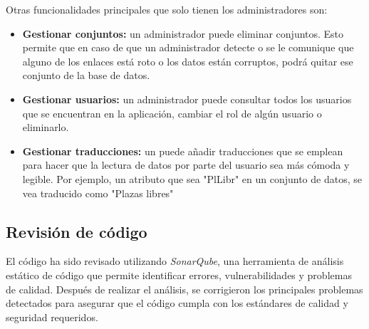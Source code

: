 Otras funcionalidades principales que solo tienen los administradores son:
\begin{itemize}
    \item \textbf{Gestionar conjuntos:} un administrador puede eliminar conjuntos. Esto permite que en caso de que un administrador detecte o se le comunique que alguno de los enlaces está roto o los datos están corruptos, podrá quitar ese conjunto de la base de datos.
    \item \textbf{Gestionar usuarios:} un administrador puede consultar todos los usuarios que se encuentran en la aplicación, cambiar el rol de algún usuario o eliminarlo.
    \item \textbf{Gestionar traducciones:} un puede añadir traducciones que se emplean para hacer que la lectura de datos por parte del usuario sea más cómoda y legible. Por ejemplo, un atributo que sea "PlLibr" en un conjunto de datos, se vea traducido como "Plazas libres"
\end{itemize}

\subsection{Revisión de código}
El código ha sido revisado utilizando \textit{SonarQube}, una herramienta de análisis estático de código que permite identificar errores, vulnerabilidades y problemas de calidad. Después de realizar el análisis, se corrigieron los principales problemas detectados para asegurar que el código cumpla con los estándares de calidad y seguridad requeridos.

\begin{comment}

Este apartado pretende recoger los aspectos más interesantes del desarrollo del proyecto, comentados por los autores del mismo.
Debe incluir desde la exposición del ciclo de vida utilizado, hasta los detalles de mayor relevancia de las fases de análisis, diseño e implementación.
Se busca que no sea una mera operación de copiar y pegar diagramas y extractos del código fuente, sino que realmente se justifiquen los caminos de solución que se han tomado, especialmente aquellos que no sean triviales.
Puede ser el lugar más adecuado para documentar los aspectos más interesantes del diseño y de la implementación, con un mayor hincapié en aspectos tales como el tipo de arquitectura elegido, los índices de las tablas de la base de datos, normalización y desnormalización, distribución en ficheros3, reglas de negocio dentro de las bases de datos (EDVHV GH GDWRV DFWLYDV), aspectos de desarrollo relacionados con el WWW...
Este apartado, debe convertirse en el resumen de la experiencia práctica del proyecto, y por sí mismo justifica que la memoria se convierta en un documento útil, fuente de referencia para los autores, los tutores y futuros alumnos.
\end{comment}